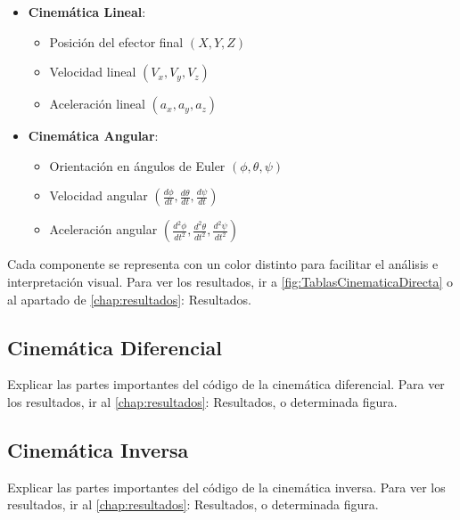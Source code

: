 \begin{itemize}
	\item \textbf{Cinemática Lineal}:
	\begin{itemize}
		\item Posición del efector final $(X, Y, Z)$
		\item Velocidad lineal $(V_x, V_y, V_z)$
		\item Aceleración lineal $(a_x, a_y, a_z)$
	\end{itemize}
	\item \textbf{Cinemática Angular}:
	\begin{itemize}
		\item Orientación en ángulos de Euler $(\phi, \theta, \psi)$
		\item Velocidad angular $\left(\frac{d\phi}{dt}, \frac{d\theta}{dt}, \frac{d\psi}{dt}\right)$
		\item Aceleración angular $\left(\frac{d^2\phi}{dt^2}, \frac{d^2\theta}{dt^2}, \frac{d^2\psi}{dt^2}\right)$
	\end{itemize}
\end{itemize}

Cada componente se representa con un color distinto para facilitar el análisis e interpretación visual. Para ver los resultados, ir a \autoref{fig:TablasCinematicaDirecta} o al apartado de \autoref{chap:resultados}: Resultados.

\subsection{Cinemática Diferencial}
Explicar las partes importantes del código de la cinemática diferencial.
Para ver los resultados, ir al \autoref{chap:resultados}: Resultados, o determinada figura.
\subsection{Cinemática Inversa}
Explicar las partes importantes del código de la cinemática inversa.
Para ver los resultados, ir al \autoref{chap:resultados}: Resultados, o determinada figura.